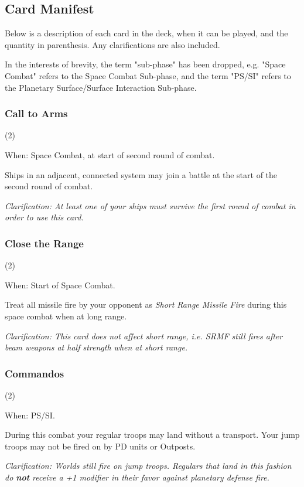 \subsection{Card Manifest}

Below is a description of each card in the deck, when it can be played, and the quantity in parenthesis. Any clarifications are also included.

In the interests of brevity, the term "sub-phase" has been dropped, e.g. "Space Combat" refers to the Space Combat Sub-phase, and the term "PS/SI" refers to the Planetary Surface/Surface Interaction Sub-phase.

\subsubsection{Call to Arms} (2)

When: Space Combat, at start of second round of combat.

Ships in an adjacent, connected system may join a battle at the start of the second round of combat.

\textit{Clarification: At least one of your ships must survive the first round of combat in order to use this card.}

\subsubsection{Close the Range} (2)

When: Start of Space Combat.

Treat all missile fire by your opponent as \textit{Short Range Missile Fire} during this space combat when at long range.

\textit{Clarification: This card does not affect short range, i.e. SRMF still fires after beam weapons at half strength when at short range.}

\subsubsection{Commandos} (2)

When: PS/SI.

During this combat your regular troops may land without a transport. Your jump troops may not be fired on by PD units or Outposts.

\textit{Clarification: Worlds still fire on jump troops. Regulars that land in this fashion do \textbf{not} receive a +1 modifier in their favor against planetary defense fire.}

